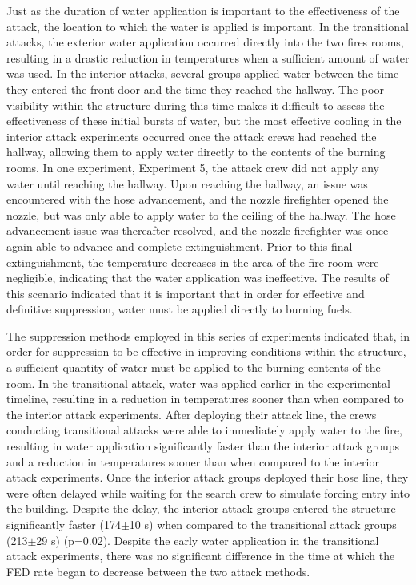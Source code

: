 \documentclass[12pt,oneside]{article}
\begin{document}
Just as the duration of water application is important to the effectiveness of the attack, the location to which the water is applied is important. In the transitional attacks, the exterior water application occurred directly into the two fires rooms, resulting in a drastic reduction in temperatures when a sufficient amount of water was used. In the interior attacks, several groups applied water between the time they entered the front door and the time they reached the hallway. The poor visibility within the structure during this time makes it difficult to assess the effectiveness of these initial bursts of water, but the most effective cooling in the interior attack experiments occurred once the attack crews had reached the hallway, allowing them to apply water directly to the contents of the burning rooms. In one experiment, Experiment 5, the attack crew did not apply any water until reaching the hallway. Upon reaching the hallway, an issue was encountered with the hose advancement, and the nozzle firefighter opened the nozzle, but was only able to apply water to the ceiling of the hallway. The hose advancement issue was thereafter resolved, and the nozzle firefighter was once again able to advance and complete extinguishment. Prior to this final extinguishment, the temperature decreases in the area of the fire room were negligible, indicating that the water application was ineffective. The results of this scenario indicated that it is important that in order for effective  and definitive suppression, water must be applied directly to burning fuels.

The suppression methods employed in this series of experiments indicated that, in order for suppression to be effective in improving conditions within the structure, a sufficient quantity of water must be applied to the burning contents of the room. In the transitional attack, water was applied earlier in the experimental timeline, resulting in a reduction in temperatures sooner than when compared to the interior attack experiments. After deploying their attack line, the crews conducting transitional attacks were able to immediately apply water to the fire, resulting in water application significantly faster than the interior attack groups and a reduction in temperatures sooner than when compared to the interior attack experiments. Once the interior attack groups deployed their hose line, they were often delayed while waiting for the search crew to simulate forcing entry into the building. Despite the delay, the interior attack groups entered the structure significantly faster (174$\pm$10 s) when compared to the transitional attack groups (213$\pm$29 s) (p=0.02). Despite the early water application in the transitional attack experiments, there was no significant difference in the time at which the FED rate began to decrease between the two attack methods. 
\end{document}
